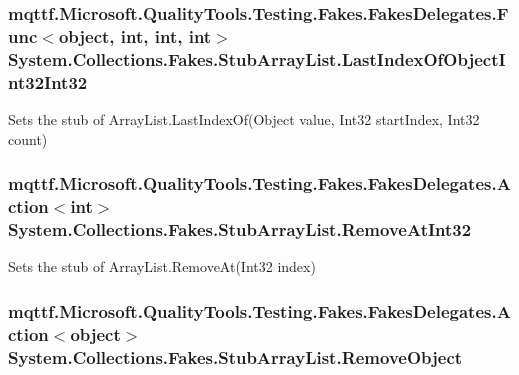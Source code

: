 \hypertarget{class_system_1_1_collections_1_1_fakes_1_1_stub_array_list_a55ca958960d5aa1c94cef74dbbd29454}{
\subsubsection[{Last\-Index\-Of\-Object\-Int32\-Int32}]{\setlength{\rightskip}{0pt plus 5cm}mqttf.\-Microsoft.\-Quality\-Tools.\-Testing.\-Fakes.\-Fakes\-Delegates.\-Func$<$object, int, int, int$>$ System.\-Collections.\-Fakes.\-Stub\-Array\-List.\-Last\-Index\-Of\-Object\-Int32\-Int32}}\label{class_system_1_1_collections_1_1_fakes_1_1_stub_array_list_a55ca958960d5aa1c94cef74dbbd29454}


Sets the stub of Array\-List.\-Last\-Index\-Of(\-Object value, Int32 start\-Index, Int32 count)

\hypertarget{class_system_1_1_collections_1_1_fakes_1_1_stub_array_list_ada5934882309fb9a1f0ddd2b05fc6faf}{
\subsubsection[{Remove\-At\-Int32}]{\setlength{\rightskip}{0pt plus 5cm}mqttf.\-Microsoft.\-Quality\-Tools.\-Testing.\-Fakes.\-Fakes\-Delegates.\-Action$<$int$>$ System.\-Collections.\-Fakes.\-Stub\-Array\-List.\-Remove\-At\-Int32}}\label{class_system_1_1_collections_1_1_fakes_1_1_stub_array_list_ada5934882309fb9a1f0ddd2b05fc6faf}


Sets the stub of Array\-List.\-Remove\-At(\-Int32 index)

\hypertarget{class_system_1_1_collections_1_1_fakes_1_1_stub_array_list_aee843eedb548c9232c8b78f2277af918}{
\subsubsection[{Remove\-Object}]{\setlength{\rightskip}{0pt plus 5cm}mqttf.\-Microsoft.\-Quality\-Tools.\-Testing.\-Fakes.\-Fakes\-Delegates.\-Action$<$object$>$ System.\-Collections.\-Fakes.\-Stub\-Array\-List.\-Remove\-Object}}\label{class_system_1_1_collections_1_1_fakes_1_1_stub_array_list_aee843eedb548c9232c8b78f2277af918}



